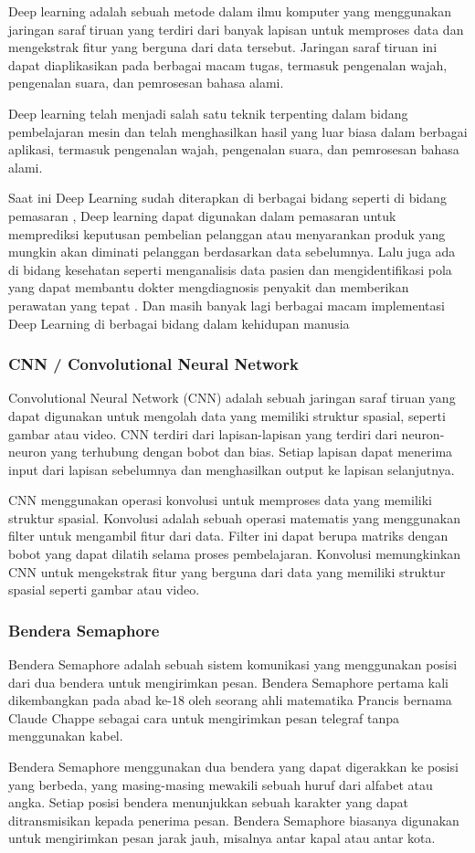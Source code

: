 Deep learning adalah sebuah metode dalam ilmu komputer yang menggunakan jaringan saraf tiruan yang terdiri dari banyak lapisan untuk memproses data dan mengekstrak fitur yang berguna dari data tersebut. Jaringan saraf tiruan ini dapat diaplikasikan pada berbagai macam tugas, termasuk pengenalan wajah, pengenalan suara, dan pemrosesan bahasa alami.

Deep learning telah menjadi salah satu teknik terpenting dalam bidang pembelajaran mesin dan telah menghasilkan hasil yang luar biasa dalam berbagai aplikasi, termasuk pengenalan wajah, pengenalan suara, dan pemrosesan bahasa alami.

Saat ini Deep Learning sudah diterapkan di berbagai bidang seperti di bidang pemasaran , Deep learning dapat digunakan dalam pemasaran untuk memprediksi keputusan pembelian pelanggan atau menyarankan produk yang mungkin akan diminati pelanggan berdasarkan data sebelumnya. Lalu juga ada di bidang kesehatan seperti  menganalisis data pasien dan mengidentifikasi pola yang dapat membantu dokter mengdiagnosis penyakit dan memberikan perawatan yang tepat . Dan masih banyak lagi berbagai macam implementasi Deep Learning di berbagai bidang dalam kehidupan manusia 

\subsubsection{CNN / Convolutional Neural Network}
Convolutional Neural Network (CNN) adalah sebuah jaringan saraf tiruan yang dapat digunakan untuk mengolah data yang memiliki struktur spasial, seperti gambar atau video. CNN terdiri dari lapisan-lapisan yang terdiri dari neuron-neuron yang terhubung dengan bobot dan bias. Setiap lapisan dapat menerima input dari lapisan sebelumnya dan menghasilkan output ke lapisan selanjutnya.

CNN menggunakan operasi konvolusi untuk memproses data yang memiliki struktur spasial. Konvolusi adalah sebuah operasi matematis yang menggunakan filter untuk mengambil fitur dari data. Filter ini dapat berupa matriks dengan bobot yang dapat dilatih selama proses pembelajaran. Konvolusi memungkinkan CNN untuk mengekstrak fitur yang berguna dari data yang memiliki struktur spasial seperti gambar atau video.

\subsubsection{Bendera Semaphore}
Bendera Semaphore adalah sebuah sistem komunikasi yang menggunakan posisi dari dua bendera untuk mengirimkan pesan. Bendera Semaphore pertama kali dikembangkan pada abad ke-18 oleh seorang ahli matematika Prancis bernama Claude Chappe sebagai cara untuk mengirimkan pesan telegraf tanpa menggunakan kabel.

Bendera Semaphore menggunakan dua bendera yang dapat digerakkan ke posisi yang berbeda, yang masing-masing mewakili sebuah huruf dari alfabet atau angka. Setiap posisi bendera menunjukkan sebuah karakter yang dapat ditransmisikan kepada penerima pesan. Bendera Semaphore biasanya digunakan untuk mengirimkan pesan jarak jauh, misalnya antar kapal atau antar kota.